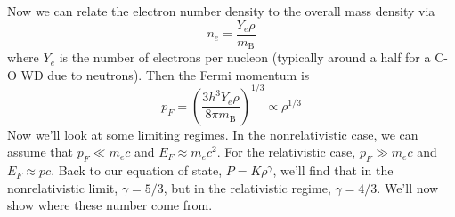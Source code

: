 \documentclass[10pt]{article}
\numberwithin{equation}{section}
\begin{document}
		Now we can relate the electron number density to the overall mass density via
		\begin{equation}
			\label{eq:wd_struc:23} n_e = \frac{Y_e\rho}{m_{\mathrm{B}}}
		\end{equation}
		where $Y_e$ is the number of electrons per nucleon (typically around a half for a C-O WD due to neutrons). Then the Fermi momentum is
		\begin{equation}
			\label{eq:wd_struc:24} p_F = \left(\frac{3h^3Y_e\rho}{8\pi m_{\mathrm{B}}}\right)^{1/3} \propto \rho^{1/3}
		\end{equation}
		Now we'll look at some limiting regimes. In the nonrelativistic case, we can assume that $p_F\ll m_e c$ and $E_F \approx m_ec^2$. For the relativistic case, $p_F \gg m_e c$ and $E_F \approx pc$. Back to our equation of state, $P=K\rho^\gamma$, we'll find that in the nonrelativistic limit, $\gamma = 5/3$, but in the relativistic regime, $\gamma = 4/3$. We'll now show where these number come from.\\
		
\end{document}
